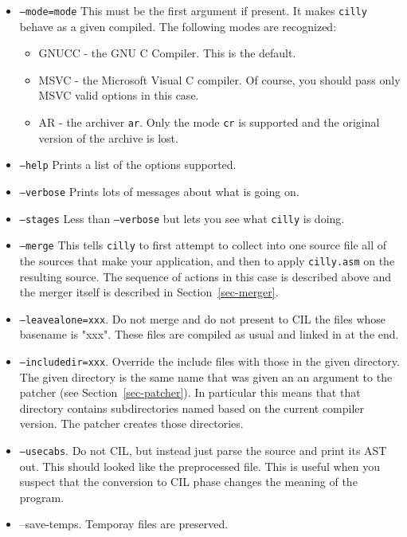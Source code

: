 \documentclass{article}
\def\secref#1{Section~\ref{sec-#1}}
\def\t#1{{\tt #1}}
\newcommand\codecolor{\ifhevea\blue\else\fi}
\renewcommand\c[1]{{\codecolor #1}} %
\begin{document}
\begin{itemize}
\item \t{--mode=mode} This must be the first argument if present. It makes
\t{cilly} behave as a given compiled. The following modes are recognized: 
     \begin{itemize}
        \item GNUCC - the GNU C Compiler. This is the default.
        \item MSVC - the Microsoft Visual C compiler. Of course, you should
                     pass only MSVC valid options in this case. 
        \item AR - the archiver \t{ar}. Only the mode \t{cr} is supported and
                   the original version of the archive is lost. 
     \end{itemize}
\item \t{--help} Prints a list of the options supported.
\item \t{--verbose} Prints lots of messages about what is going on.
\item \t{--stages} Less than \t{--verbose} but lets you see what \t{cilly}
                   is doing. 
\item \t{--merge} This tells \t{cilly} to first attempt to collect into one
source file all of the sources that make your application, and then to apply
\t{cilly.asm} on the resulting source. The sequence of actions in this case is
described above and the merger itself is described in \secref{merger}.

\item \t{--leavealone=xxx}. Do not merge and do not present to CIL the files
whose basename is "xxx". These files are compiled as usual and linked in at
the end. 
\item \t{--includedir=xxx}. Override the include files with those in the given
directory. The given directory is the same name that was given an an argument
to the patcher (see \secref{patcher}). In particular this means that
that directory contains subdirectories named based on the current compiler
version. The patcher creates those directories. 
\item \t{--usecabs}. Do not CIL, but instead just parse the source and print
its AST out. This should looked like the preprocessed file. This is useful
when you suspect that the conversion to CIL phase changes the meaning of the
program. 
\item \c{--save-temps}. Temporay files are preserved. 
\end{itemize}
 
\end{document}
